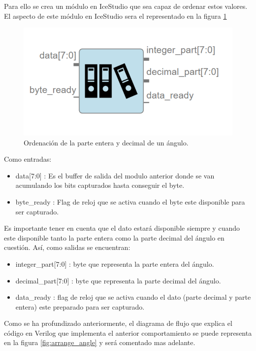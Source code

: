 Para ello se crea un módulo en IceStudio que sea capaz de ordenar estos valores. El aspecto de este módulo en IceStudio sera el representado en la figura \ref{fig:arrange_arduino}

\begin{figure}[H]
	\center
	\includegraphics[scale=0.5]{imagenes/Balancing_robot/arrange_arduino.PNG}
	\caption{Ordenación de la parte entera y decimal de un ángulo.}
	\label{fig:arrange_arduino}
\end{figure}

Como entradas:

\begin{itemize}
	\item data[7:0] : Es el buffer de salida del modulo anterior donde se van acumulando los bits capturados hasta conseguir el byte.
	\item byte\_ready : Flag de reloj que se activa cuando el byte este disponible para ser capturado.
\end{itemize}

Es importante tener en cuenta que el dato estará disponible siempre y cuando este disponible tanto la parte entera como la parte decimal del ángulo en cuestión. Así, como salidas se encuentran:

\begin{itemize}
	\item integer\_part[7:0] : byte que representa la parte entera del ángulo.
	\item decimal\_part[7:0] : byte que representa la parte decimal del ángulo.
	\item data\_ready : flag de reloj que se activa cuando el dato (parte decimal y parte entera) este preparado para ser capturado.	
\end{itemize}

Como se ha profundizado anteriormente, el diagrama de flujo que explica el código en Verilog que implementa el anterior comportamiento se puede representa en la figura \ref{fig:arrange_angle} y será comentado mas adelante.

